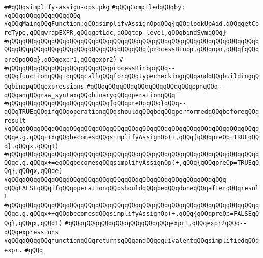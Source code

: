 \label{src/lib/c-kit/src/ast/simplify-assign-ops.pkg}
\verb|##qQQqsimplify-assign-ops.pkg|\newline
\newline
\verb|#qQQqCompiledqQQqby:|\newline
\verb|#qQQqqQQqqQQqqQQqqQQq|\newline
\newline
\verb|#qQQqMainqQQqFunction:qQQqsimplifyAssignOpqQQq{qQQqlookUpAid,qQQqgetCoreType,qQQqwrapEXPR,qQQqgetLoc,qQQqtop_level,qQQqbindSymqQQq}|\newline
\verb|#qQQqqQQqqQQqqQQqqQQqqQQqqQQqqQQqqQQqqQQqqQQqqQQqqQQqqQQqqQQqqQQqqQQqqQQqqQQqqQQqqQQqqQQqqQQqqQQqqQQqqQQqqQQq(processBinop,qQQqopn,qQQq{qQQqpreOpqQQq},qQQqexpr1,qQQqexpr2)|\newline
\verb|#|\newline
\verb|#qQQqqQQqqQQqqQQqqQQqqQQqqQQqprocessBinopqQQq--qQQqfunctionqQQqtoqQQqcallqQQqforqQQqtypecheckingqQQqandqQQqbuildingqQQqbinopqQQqexpressions|\newline
\verb|#qQQqqQQqqQQqqQQqqQQqqQQqqQQqopnqQQq--qQQqanqQQqraw_syntaxqQQqbinaryqQQqoperationqQQq|\newline
\verb|#qQQqqQQqqQQqqQQqqQQqqQQqqQQq{qQQqpreOpqQQq}qQQq--qQQqTRUEqQQqifqQQqoperationqQQqshouldqQQqbeqQQqperformedqQQqbeforeqQQqresult|\newline
\verb|#qQQqqQQqqQQqqQQqqQQqqQQqqQQqqQQqqQQqqQQqqQQqqQQqqQQqqQQqqQQqqQQqqQQqqQQqe.g.qQQq++xqQQqbecomesqQQqsimplifyAssignOp(+,qQQq{qQQqpreOp=TRUEqQQq},qQQqx,qQQq1)|\newline
\verb|#qQQqqQQqqQQqqQQqqQQqqQQqqQQqqQQqqQQqqQQqqQQqqQQqqQQqqQQqqQQqqQQqqQQqqQQqe.g.qQQqx+=eqQQqbecomesqQQqsimplifyAssignOp(+,qQQq{qQQqpreOp=TRUEqQQq},qQQqx,qQQqe)|\newline
\verb|#qQQqqQQqqQQqqQQqqQQqqQQqqQQqqQQqqQQqqQQqqQQqqQQqqQQqqQQqqQQq--qQQqFALSEqQQqifqQQqoperationqQQqshouldqQQqbeqQQqdoneqQQqafterqQQqresult|\newline
\verb|#qQQqqQQqqQQqqQQqqQQqqQQqqQQqqQQqqQQqqQQqqQQqqQQqqQQqqQQqqQQqqQQqqQQqqQQqe.g.qQQqx++qQQqbecomesqQQqsimplifyAssignOp(+,qQQq{qQQqpreOp=FALSEqQQq},qQQqx,qQQq1)|\newline
\verb|#qQQqqQQqqQQqqQQqqQQqqQQqqQQqexpr1,qQQqexpr2qQQq--qQQqexpressions|\newline
\verb|#qQQqqQQqqQQqfunctionqQQqreturnsqQQqanqQQqequivalentqQQqsimplifiedqQQqexpr.|\newline
\verb|#qQQq|\newline
